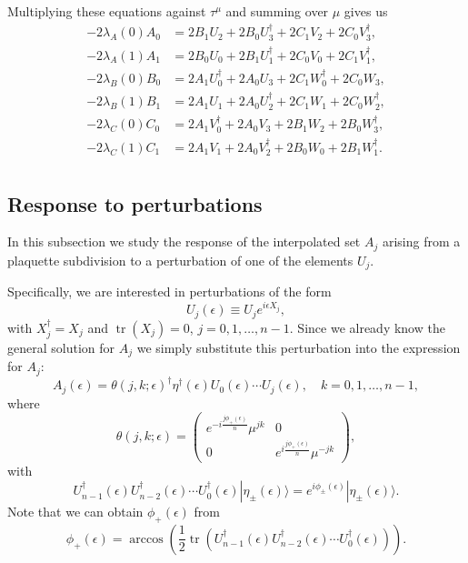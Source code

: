\documentclass[12pt]{amsart}
\newcommand{\tr}{\operatorname{tr}}
\theoremstyle{definition}
\theoremstyle{remark}
\numberwithin{equation}{section}
\begin{document}
Multiplying these equations against $\tau^\mu$ and summing over $\mu$ gives us
\begin{equation}
	\begin{split}
		-2\lambda_A(0) A_0 &= 2B_1 U_2 + 2B_0 U_3^\dag + 2C_1 V_2 + 2C_0V_3^\dag, \\
		-2\lambda_A(1) A_1 &= 2B_0 U_0 + 2B_1 U_1^\dag + 2C_0 V_0 + 2C_1V_1^\dag, \\
		-2\lambda_B(0) B_0 &= 2A_1 U_0^\dag + 2A_0 U_3 + 2C_1 W_0^\dag + 2C_0W_3, \\
		-2\lambda_B(1) B_1 &= 2A_1 U_1 + 2A_0 U_2^\dag + 2C_1 W_1 + 2C_0W_2^\dag, \\
		-2\lambda_C(0) C_0 &= 2A_1 V_0^\dag + 2A_0 V_3 + 2B_1 W_2 + 2B_0W_3^\dag, \\
		-2\lambda_C(1) C_1 &= 2A_1 V_1 + 2A_0 V_2^\dag + 2B_0 W_0 + 2B_1W_1^\dag. \\ 
	\end{split}
\end{equation}


\subsection{Response to perturbations}
In this subsection we study the response of the interpolated set $A_j$ arising from a plaquette subdivision to a perturbation of one of the elements $U_j$.

Specifically, we are interested in perturbations of the form
\begin{equation}
	U_j(\epsilon) \equiv U_j e^{i\epsilon X_j},
\end{equation}
with $X^\dag_j = X_j$ and $\tr(X_j) = 0$, $j = 0, 1, \ldots, n-1$. Since we already know the general solution for $A_j$ we simply substitute this perturbation into the expression for $A_j$:
\begin{equation}
	A_j(\epsilon) = \theta(j,k; \epsilon)^\dag \eta^\dag(\epsilon) U_0(\epsilon) \cdots U_{j}(\epsilon), \quad k = 0, 1, \ldots, n-1,
\end{equation}
where 
\begin{equation}	
	\theta(j,k; \epsilon) = \begin{pmatrix} e^{-i\frac{j\phi_{+}(\epsilon)}{n}}\mu^{jk} & 0 \\ 0 &  e^{i\frac{j\phi_{+}(\epsilon)}{n}}\mu^{-jk}\end{pmatrix},
\end{equation}
with 
\begin{equation}
	U_{n-1}^\dag(\epsilon) U_{n-2}^\dag(\epsilon) \cdots U_0^\dag(\epsilon) |\eta_{\pm}(\epsilon)\rangle = e^{i\phi_{\pm}(\epsilon)}|\eta_{\pm}(\epsilon)\rangle.
\end{equation}
Note that we can obtain $\phi_+(\epsilon)$ from
\begin{equation}
	\phi_+(\epsilon) = \arccos\left(\frac12 \tr(U_{n-1}^\dag(\epsilon) U_{n-2}^\dag(\epsilon) \cdots U_0^\dag(\epsilon))\right).
\end{equation}
\end{document}
